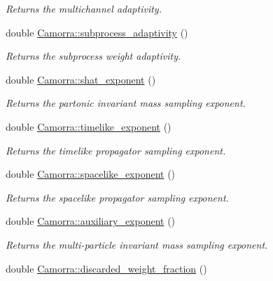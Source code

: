 \begin{DoxyCompactItemize}
\begin{DoxyCompactList}\small\item\em Returns the multichannel adaptivity. \end{DoxyCompactList}\item 
\hypertarget{a00798_a8965d38dd51a83eeeb0c1217e462589a}{
double \hyperlink{a00798_a8965d38dd51a83eeeb0c1217e462589a}{Camorra::subprocess\_\-adaptivity} ()}
\label{a00798_a8965d38dd51a83eeeb0c1217e462589a}

\begin{DoxyCompactList}\small\item\em Returns the subprocess weight adaptivity. \end{DoxyCompactList}\item 
\hypertarget{a00798_aa340a7a07cd22c94638bcce39532a92b}{
double \hyperlink{a00798_aa340a7a07cd22c94638bcce39532a92b}{Camorra::shat\_\-exponent} ()}
\label{a00798_aa340a7a07cd22c94638bcce39532a92b}

\begin{DoxyCompactList}\small\item\em Returns the partonic invariant mass sampling exponent. \end{DoxyCompactList}\item 
\hypertarget{a00798_a35d1bbad2438b461f5db90b09f6346bf}{
double \hyperlink{a00798_a35d1bbad2438b461f5db90b09f6346bf}{Camorra::timelike\_\-exponent} ()}
\label{a00798_a35d1bbad2438b461f5db90b09f6346bf}

\begin{DoxyCompactList}\small\item\em Returns the timelike propagator sampling exponent. \end{DoxyCompactList}\item 
\hypertarget{a00798_a287ab4732362246bdd4b763bd22e957f}{
double \hyperlink{a00798_a287ab4732362246bdd4b763bd22e957f}{Camorra::spacelike\_\-exponent} ()}
\label{a00798_a287ab4732362246bdd4b763bd22e957f}

\begin{DoxyCompactList}\small\item\em Returns the spacelike propagator sampling exponent. \end{DoxyCompactList}\item 
\hypertarget{a00798_ae2574c2de709f48846ef66865357b28c}{
double \hyperlink{a00798_ae2574c2de709f48846ef66865357b28c}{Camorra::auxiliary\_\-exponent} ()}
\label{a00798_ae2574c2de709f48846ef66865357b28c}

\begin{DoxyCompactList}\small\item\em Returns the multi-\/particle invariant mass sampling exponent. \end{DoxyCompactList}\item 
\hypertarget{a00798_a10796df96abe25ecff8b7e25ff14a21b}{
double \hyperlink{a00798_a10796df96abe25ecff8b7e25ff14a21b}{Camorra::discarded\_\-weight\_\-fraction} ()}
\label{a00798_a10796df96abe25ecff8b7e25ff14a21b}


\end{DoxyCompactItemize}
